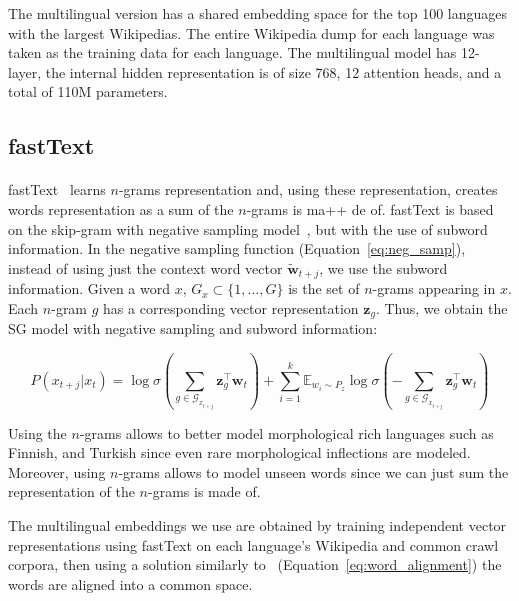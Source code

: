 The multilingual version has a shared embedding space for the top 100 languages with the largest Wikipedias. The entire Wikipedia dump for each language was taken as the training data for each language. The multilingual model has 12-layer, the internal hidden representation is of size 768, 12 attention heads, and a total of 110M parameters.

\subsection{fastText}
\paragraph{}
fastText~\citep{bojanowski2016enriching} learns $n$-grams representation and, using these representation, creates words representation as a sum of the $n$-grams is ma++
de of. fastText is based on the skip-gram with negative sampling model~\citep{mikolov2013distributed}, but with the use of subword information. In the negative sampling function (Equation~\ref{eq:neg_samp}), instead of using just the context word vector $\mathbf{\tilde{w}}_{t+j}$, we use the subword information. Given a word $x$, $G_x \subset \{1, \dots, G\}$ is the set of $n$-grams appearing in $x$. Each $n$-gram $g$ has a corresponding vector representation $\mathbf{z}_{g}$. Thus, we obtain the SG model with negative sampling and subword information:  

\begin{equation}
P\left(x_{t+j} | x_{t}\right)=\log \sigma\left( \sum_{g \in \mathcal{G}_{x_{t+j}}} \mathbf{z}_{g}^{\top} \mathbf{w}_{t}\right)+\sum_{i=1}^{k} \mathbb{E}_{w_{i} \sim P_{z}} \log \sigma\left(- \sum_{g \in \mathcal{G}_{x_{t+j}}} \mathbf{z}_{g}^{\top}\mathbf{w}_{t}\right)
\end{equation}

Using the $n$-grams allows to better model morphological rich languages such as Finnish, and Turkish since even rare morphological inflections are modeled. Moreover, using $n$-grams allows to model unseen words since we can just sum the representation of the $n$-grams is made of. 

The multilingual embeddings we use are obtained by training independent vector representations using fastText on each language's Wikipedia and common crawl corpora, then using a solution similarly to~\citep{mikolov2013exploiting} (Equation~\ref{eq:word_alignment}) the words are aligned into a common space. 

